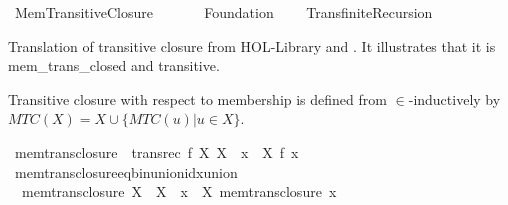 %
\begin{isabellebody}%
%
%
\isadelimdocument
%
\endisadelimdocument
%
\isatagdocument
\isanewline
%
\isamarkuptrue%
%
\endisatagdocument
{\isafolddocument}%
%
\isadelimdocument
%
\endisadelimdocument
%
\isadelimtheory
%
\endisadelimtheory
%
\isatagtheory
{}\isamarkupfalse%
\ Mem{\isacharunderscore}{\kern0pt}Transitive{\isacharunderscore}{\kern0pt}Closure\isanewline
\ \ \isanewline
\ \ \ \ Foundation\isanewline
\ \ \ \ Transfinite{\isacharunderscore}{\kern0pt}Recursion\isanewline
{}%
\endisatagtheory
{\isafoldtheory}%
%
\isadelimtheory
%
\endisadelimtheory
%
\isadelimdocument
%
\endisadelimdocument
%
\isatagdocument
%
\isamarkuptrue%
%
\endisatagdocument
{\isafolddocument}%
%
\isadelimdocument
%
\endisadelimdocument
%
\begin{isamarkuptext}%
Translation of transitive closure from HOL-Library and \cite{ZFC_in_HOL_AFP}.
It illustrates that it is mem\_trans\_closed and transitive.%
\end{isamarkuptext}\isamarkuptrue%
%
\isadelimdocument
%
\endisadelimdocument
%
\isatagdocument
%
\isamarkuptrue%
%
\endisatagdocument
{\isafolddocument}%
%
\isadelimdocument
%
\endisadelimdocument
%
\begin{isamarkuptext}%
Transitive closure with respect to membership is defined from \cite{ZFC_in_HOL_AFP}
 $\in$-inductively by $MTC(X) = X \cup \{MTC(u) | u \in X\}$.%
\end{isamarkuptext}\isamarkuptrue%
\isamarkupfalse%
\ {\isachardoublequoteopen}mem{\isacharunderscore}{\kern0pt}trans{\isacharunderscore}{\kern0pt}closure\ {\isasymequiv}\ transrec\ {\isacharparenleft}{\kern0pt}{\isasymlambda}f\ X{\isachardot}{\kern0pt}\ X\ {\isasymunion}\ {\isacharparenleft}{\kern0pt}{\isasymUnion}x\ {\isasymin}\ X{\isachardot}{\kern0pt}\ f\ x{\isacharparenright}{\kern0pt}{\isacharparenright}{\kern0pt}{\isachardoublequoteclose}\isanewline
\isanewline
{}\isamarkupfalse%
\ mem{\isacharunderscore}{\kern0pt}trans{\isacharunderscore}{\kern0pt}closure{\isacharunderscore}{\kern0pt}eq{\isacharunderscore}{\kern0pt}bin{\isacharunderscore}{\kern0pt}union{\isacharunderscore}{\kern0pt}idx{\isacharunderscore}{\kern0pt}union{\isacharcolon}{\kern0pt}\isanewline
\ \ {\isachardoublequoteopen}mem{\isacharunderscore}{\kern0pt}trans{\isacharunderscore}{\kern0pt}closure\ X\ {\isacharequal}{\kern0pt}\ X\ {\isasymunion}\ {\isacharparenleft}{\kern0pt}{\isasymUnion}x\ {\isasymin}\ X{\isachardot}{\kern0pt}\ mem{\isacharunderscore}{\kern0pt}trans{\isacharunderscore}{\kern0pt}closure\ x{\isacharparenright}{\kern0pt}{\isachardoublequoteclose}\isanewline

\end{isabellebody}
